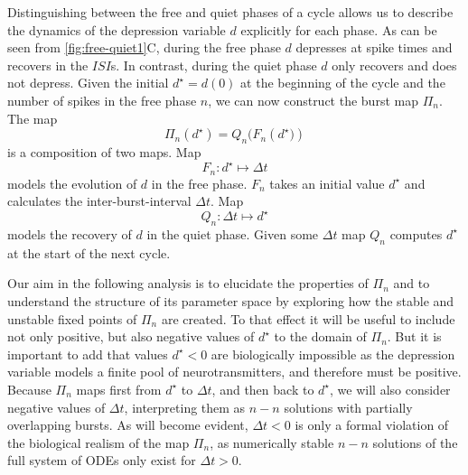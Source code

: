 \documentclass[utf8]{frontiersFPHY} %
\newcommand{\dstar}{d^\star}
\newcommand{\delt}{\Delta t}
\begin{document}
Distinguishing between the free and quiet phases of a cycle allows us to describe the dynamics of the depression variable $d$ explicitly for each phase.
As can be seen from \cref{fig:free-quiet1}C, during the free phase $d$ depresses at spike times and recovers in the $ISI$s.
In contrast, during the quiet phase $d$ only recovers and does not depress.
Given the initial $d^{\star}=d(0)$ at the beginning of the cycle and the number of spikes in the free phase $n$, we can now construct the burst map $\Pi_{n}$.
The map
\begin{equation}
  \Pi_{n}(d^{\star})=Q_{n}\big(F_{n}(d^{\star}\big))
\end{equation}
\noindent
is a composition of two maps.
Map
\begin{equation}
  F_{n}:d^{\star}\mapsto \delt
\end{equation}
models the evolution of $d$ in the free phase.
$F_{n}$ takes an initial value $d^{\star}$ and calculates the inter-burst-interval $\delt$.
Map
\begin{equation}
  Q_{n}:\delt \mapsto d^{\star}
\end{equation}
models the recovery of $d$ in the quiet phase.
Given some $\delt$ map $Q_n$ computes $\dstar$ at the start of the next cycle.

Our aim in the following analysis is to elucidate the properties of $\Pi_{n}$ and to understand the structure of its parameter space by exploring how the stable and unstable fixed points of $\Pi_{n}$ are created.
To that effect it will be useful to include not only positive, but also negative values of $d^{\star}$ to the domain of $\Pi_{n}$.
But it is important to add that values $d^{\star}<0$ are biologically impossible as the depression variable models a finite pool of neurotransmitters, and therefore must be positive.
Because $\Pi_{n}$ maps first from $d^{\star}$ to $\delt$, and then back to $d^{\star}$, we will also consider negative values of $\Delta t$, interpreting them as $n-n$ solutions with partially overlapping bursts.
As will become evident, $\delt<0$ is only a formal violation of the biological realism of the map $\Pi_{n}$, as numerically stable $n-n$ solutions of the full system of ODEs only exist for $\Delta t>0$.
\end{document}
